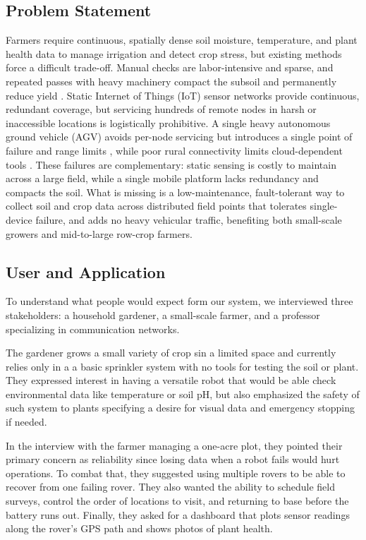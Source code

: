 \documentclass[12pt, letterpaper]{article}
\begin{document}
\subsection{Problem Statement}
Farmers require continuous, spatially dense soil moisture, temperature, and plant health data to manage irrigation and detect crop stress, but existing methods force a difficult trade-off. Manual checks are labor-intensive and sparse, and repeated passes with heavy machinery compact the subsoil and permanently reduce yield \cite{shaheb2021}. Static Internet of Things (IoT) sensor networks provide continuous, redundant coverage, but servicing hundreds of remote nodes in harsh or inaccessible locations is logistically prohibitive\cite{khan2015}. A single heavy autonomous ground vehicle (AGV) avoids per-node servicing but introduces a single point of failure and range limits \cite{shreyas2018}, while poor rural connectivity limits cloud-dependent tools \cite{rehman2017}. These failures are complementary: static sensing is costly to maintain across a large field, while a single mobile platform lacks redundancy and compacts the soil. What is missing is a low-maintenance, fault-tolerant way to collect soil and crop data across distributed field points that tolerates single-device failure, and adds no heavy vehicular traffic, benefiting both small-scale growers and mid-to-large row-crop farmers.


\subsection{User and Application}
To understand what people would expect form our system, we interviewed three stakeholders: a household gardener, a small-scale farmer, and a professor specializing in communication networks.

The gardener grows a small variety of crop sin a limited space and currently relies only in a a basic sprinkler system with no tools for testing the soil or plant. They expressed interest in having a versatile robot that would be able check environmental data like temperature or soil pH, but also emphasized the safety of such system to plants specifying a desire for visual data and emergency stopping if needed.

In the interview with the farmer managing a one-acre plot, they pointed their primary concern as reliability since losing data when a robot fails would hurt operations. To combat that, they suggested using multiple rovers to be able to recover from one failing rover. They also wanted the ability to schedule field surveys, control the order of locations to visit, and returning to base before the battery runs out. Finally, they asked for a dashboard that plots sensor readings along the rover's GPS path and shows photos of plant health.
\end{document}
